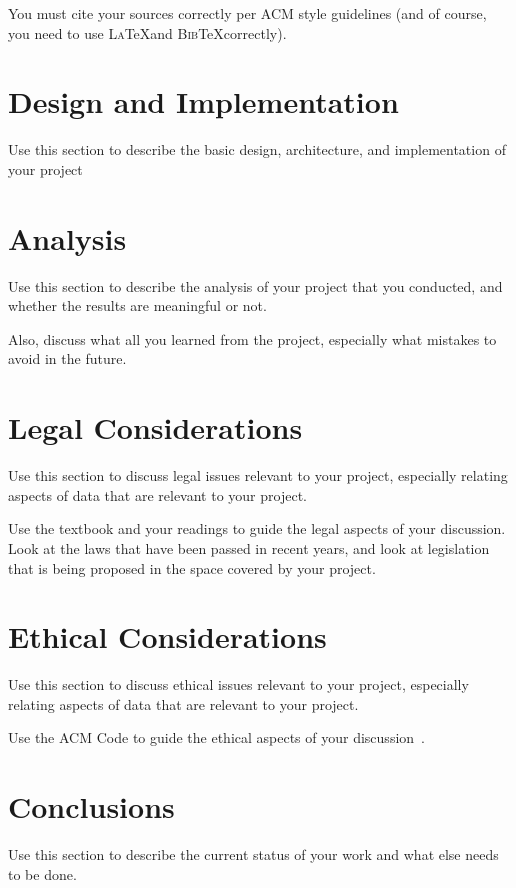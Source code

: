 \documentclass[sigconf, anonymous]{acmart}
\def\BibTeX{\textsc{Bib}\TeX}
\def\LaTeX{\textsc{La}\TeX}
\begin{document}
You must cite your sources correctly per ACM style guidelines (and of
course, you need to use \LaTeX and \BibTeX correctly).

\section{Design and Implementation}
\label{design}

Use this section to describe the basic design, architecture, and
implementation of your project

\section{Analysis}
\label{analysis}
Use this section to describe the analysis of your project that you
conducted, and whether the results are meaningful or not.

Also, discuss what all you learned from the project, especially what
mistakes to avoid in the future.

\section{Legal Considerations}
\label{legal considerations}

Use this section to discuss legal issues relevant to your project,
especially relating aspects of data that are relevant to your project.

Use the textbook and your readings to guide the legal aspects of your
discussion. Look at the laws that have been passed in recent years,
and look at legislation that is being proposed in the space covered by
your project.

\section{Ethical Considerations}
\label{ethical considerations}

Use this section to discuss ethical issues relevant to your
project, especially relating aspects of data that are relevant to your
project.

Use the ACM Code to guide the ethical aspects of your
discussion~\cite{ACMCODE}.


\section{Conclusions}
\label{conclusions}

Use this section to describe the current status of your work
and what else needs to be done.
\end{document}

